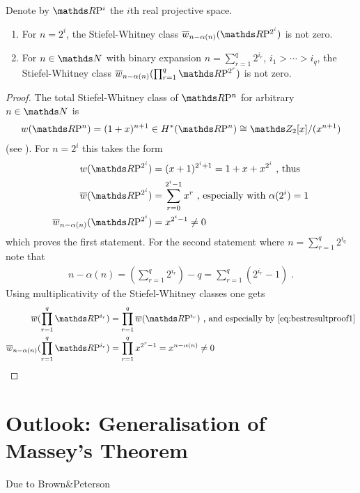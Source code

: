 \begin{Thm}
  Denote by $\RP{i}$ the $i$th real projective space.
  \begin{enumerate}
  \item For $n=2^i$, the Stiefel-Whitney class
    $\dualw{n-\alpha(n)}{\RP{2^i}}$ is not zero.
  \item For $n\in\Nat$ with binary expansion
    $n=\sum_{r=1}^{q}2^{i_r}$, $i_1>\dotsb>i_q$, the Stiefel-Whitney class
    $\dualw{n-\alpha(n)}{\prod_{r=1}^{q}\RP{2^r}}$ is not zero.
  \end{enumerate}
  \begin{proof}
    The total Stiefel-Whitney class of $\RP{n}$ for arbitrary
    $n\in\Nat$ is
    \begin{gather*}
      \W{\RP n} = (1+x)^{n+1}\in\H^*(\RP n)\cong \Zmod2[x]/(x^{n+1})
    \end{gather*}
    (see \forexample \cite[Example~(19.4.1)]{tomdieck}).
    For $n=2^i$ this takes the form
    \begin{align*}
      \W{\RP{2^i}}
      &= (x+1)^{2^i+1}
      = 1 + x + x^{2^i}
        \text{ , thus} \\
      \dualW{\RP{2^i}}
      &= \sum_{r=0}^{2^i-1} x^r
        \text{ , especially with $\alpha(2^i)=1$} \\
      \dualw{n-\alpha(n)}{\RP{2^i}}
      &= x^{2^i-1}\neq 0
    \end{align*}
    which proves the first statement.
    For the second statement where $n=\sum_{r=1}^q 2^{i_q}$ note that
    \begin{gather}\label{eq:bestresultproof1}
      n-\alpha(n)
      = \left( \sum_{r=1}^q 2^{i_r} \right) - q
      = \sum_{r=1}^q \left( 2^{i_r} - 1 \right)
      \;.
    \end{gather}
    Using multiplicativity %
    of the Stiefel-Whitney classes one gets
    \begin{align*}
      \dualW{\prod_{r=1}^q \RP{i_r}}
      &= \prod_{r=1}^q \dualW{\RP{i_r}}
        \text{ , and especially by \eqref{eq:bestresultproof1}} \\
      \dualw{n-\alpha(n)}{\prod_{r=1}^{q}\RP{i_r}}
      &= \prod_{r=1}^q x^{2^r-1}
        = x^{n-\alpha(n)} \neq 0
        \qedhere
    \end{align*}
  \end{proof}
\end{Thm}


\section{Outlook: Generalisation of Massey's Theorem}
Due to Brown\&Peterson


